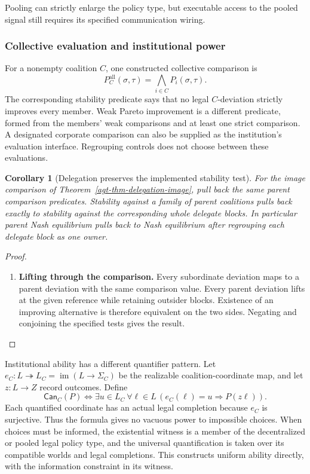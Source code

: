 \documentclass[11pt,a4paper]{article}
\numberwithin{equation}{section}
\newtheorem{corollary}[theorem]{Corollary}
\theoremstyle{definition}
\theoremstyle{remark}
\theoremstyle{plain}
\providecommand{\im}{\mathop{\mathrm{im}}}
\begin{document}
Pooling can strictly enlarge the policy type, but executable access
to the pooled signal still requires its specified communication wiring.

\subsubsection{Collective evaluation and institutional power}

For a nonempty coalition $C$, one constructed collective comparison is
\[
 P_C^{\mathrm{all}}(\sigma,\tau)
 =\bigwedge_{i\in C}P_i(\sigma,\tau).
\]
The corresponding stability predicate says that no legal $C$-deviation
strictly improves every member. Weak Pareto improvement is a different
predicate, formed from the members' weak comparisons and at least one
strict comparison. A designated corporate comparison can also be supplied
as the institution's evaluation interface. Regrouping controls does not
choose between these evaluations.

\begin{corollary}[Delegation preserves the implemented stability test]
For the image comparison of Theorem~\ref{agt-thm-delegation-image}, pull back
the same parent comparison predicates. Stability against a family of parent
coalitions pulls back exactly to stability against the corresponding whole
delegate blocks. In particular parent Nash equilibrium pulls back to Nash
equilibrium after regrouping each delegate block as one owner.
\end{corollary}
\begin{proof}
\leavevmode
\begin{enumerate}[label=\textup{(\arabic*)},leftmargin=*,itemsep=4pt,topsep=3pt]
  \item \textbf{Lifting through the comparison.} Every subordinate deviation maps to a parent deviation with the same
comparison value. Every parent deviation lifts at the given reference
while retaining outsider blocks. Existence of an improving alternative is
therefore equivalent on the two sides. Negating and conjoining the specified
tests gives the result.
\end{enumerate}
\end{proof}

Institutional ability has a different quantifier pattern. Let
$e_C:L\twoheadrightarrow L_C=\im(L\to\Sigma_C)$ be the realizable
coalition-coordinate map, and let $z:L\to Z$ record outcomes. Define
\begin{equation}
 \mathsf{Can}_C(P)
 \iff\exists u\in L_C\ \forall\ell\in L\,
          (e_C(\ell)=u\Rightarrow P(z\ell)).
 \label{agt-eq-effectivity}
\end{equation}
Each quantified coordinate has an actual legal completion because $e_C$ is
surjective. Thus the formula gives no vacuous power to impossible choices.
When choices must be informed, the existential witness is a member of the
decentralized or pooled legal policy type, and the universal quantification
is taken over its compatible worlds and legal completions. This constructs
uniform ability directly, with the information constraint in its witness.
\end{document}

